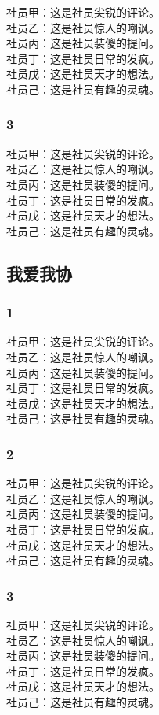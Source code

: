 \documentclass[9pt]{book}
\begin{document}
\newpage
\mybackground
\begin{multicols}{2}
\setlength{\parindent}{0pt}
社员甲：这是社员尖锐的评论。\\
社员乙：这是社员惊人的嘲讽。\\
社员丙：这是社员装傻的提问。\\
社员丁：这是社员日常的发疯。\\
社员戊：这是社员天才的想法。\\
社员己：这是社员有趣的灵魂。 
\subsubsection*{3}
社员甲：这是社员尖锐的评论。\\
社员乙：这是社员惊人的嘲讽。\\
社员丙：这是社员装傻的提问。\\
社员丁：这是社员日常的发疯。\\
社员戊：这是社员天才的想法。\\
社员己：这是社员有趣的灵魂。
\subsection*{我爱我协}
\subsubsection*{1}
社员甲：这是社员尖锐的评论。\\
社员乙：这是社员惊人的嘲讽。\\
社员丙：这是社员装傻的提问。\\
社员丁：这是社员日常的发疯。\\
社员戊：这是社员天才的想法。\\
社员己：这是社员有趣的灵魂。
\subsubsection*{2}
社员甲：这是社员尖锐的评论。\\
社员乙：这是社员惊人的嘲讽。\\
社员丙：这是社员装傻的提问。\\
社员丁：这是社员日常的发疯。\\
社员戊：这是社员天才的想法。\\
社员己：这是社员有趣的灵魂。
\subsubsection*{3}
社员甲：这是社员尖锐的评论。\\
社员乙：这是社员惊人的嘲讽。\\
社员丙：这是社员装傻的提问。\\
社员丁：这是社员日常的发疯。\\
社员戊：这是社员天才的想法。\\
社员己：这是社员有趣的灵魂。


\end{multicols}
\end{document}
